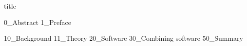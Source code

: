 \documentclass[12pt]{article}
\begin{document}
{title}

\frontmatter \ownfrontmatter

{0_Abstract}
{1_Preface}

\tableofcontents

\listoffigures
\listoftables

\pagebreak


\mainmatter \ownmainmatter

{10_Background}
{11_Theory}
{20_Software}
{30_Combining software}
{50_Summary}



\newpage
\printbibliography[heading = bibintoc, title = Bibliography]    %


\end{document}

